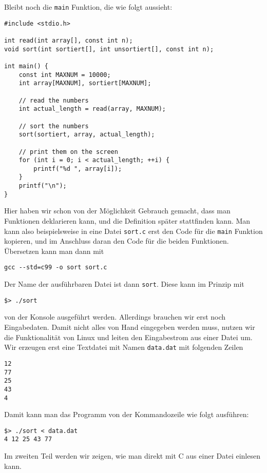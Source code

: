 Bleibt noch die \verb|main| Funktion, die wie folgt aussieht:
\begin{lstlisting}
#include <stdio.h>

int read(int array[], const int n);
void sort(int sortiert[], int unsortiert[], const int n);

int main() {
    const int MAXNUM = 10000;
    int array[MAXNUM], sortiert[MAXNUM];

    // read the numbers
    int actual_length = read(array, MAXNUM);

    // sort the numbers
    sort(sortiert, array, actual_length);

    // print them on the screen
    for (int i = 0; i < actual_length; ++i) {
        printf("%d ", array[i]);
    }
    printf("\n");
}
\end{lstlisting}
Hier haben wir schon von der Möglichkeit Gebrauch gemacht, dass man Funktionen deklarieren kann, und die Definition später stattfinden kann.
Man kann also beispielsweise in eine Datei \verb|sort.c| erst den Code für die \verb|main| Funktion kopieren, und im Anschluss daran den Code für die beiden Funktionen.
Übersetzen kann man dann mit
\begin{verbatim}
gcc --std=c99 -o sort sort.c
\end{verbatim}
Der Name der ausführbaren Datei ist dann \verb|sort|.
Diese kann im Prinzip mit
\begin{verbatim}
$> ./sort
\end{verbatim}
von der Konsole ausgeführt werden.
Allerdings brauchen wir erst noch Eingabedaten.
Damit nicht alles von Hand eingegeben werden muss, nutzen wir die Funktionalität von Linux und leiten den Eingabestrom aus einer Datei um.
Wir erzeugen erst eine Textdatei mit Namen \verb|data.dat| mit folgenden Zeilen
\begin{lstlisting}
12
77
25
43
4
\end{lstlisting}
Damit kann man das Programm von der Kommandozeile wie folgt ausführen:
\begin{verbatim}
$> ./sort < data.dat
4 12 25 43 77
\end{verbatim}
Im zweiten Teil werden wir zeigen, wie man direkt mit C aus einer Datei einlesen kann.

\endinput

